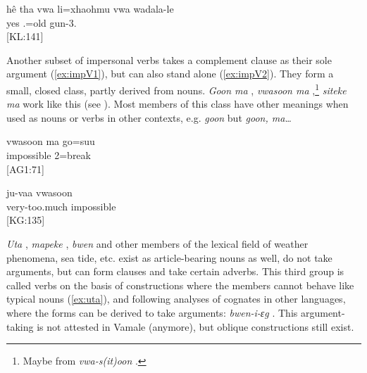 \ea \label{ex:vwa_have}\gll hê tha vwa li=xhaohmu vwa wadala-le\\
 yes   .=old  gun-3.\\
\glt {} {[KL:141]} 
\z

Another subset of impersonal verbs takes a complement clause as their sole argument (\ref{ex:impV1}), but can also stand alone (\ref{ex:impV2}). They form a small, closed class, partly derived from nouns. \textit{Goon ma} , \textit{vwasoon ma} ,\footnote{Maybe from \textit{vwa-s(it)oon} .} \textit{siteke ma}  work like this (see ). 
Most members of this class have other meanings when used as nouns or verbs in other contexts, e.g. \textit{goon}  but \textit{goon, ma\ldots} 


\ea\label{ex:impV1}\gll vwasoon ma go=suu\\
 impossible  2=break\\
\glt {} {[AG1:71]}
\z

\ea\label{ex:impV2}\gll ju-vaa vwasoon\\
 very-too.much impossible\\
\glt {} {[KG:135]}
\z


% 
%
%
%
%

%
%


\textit{Uta} , \textit{mapeke} , \textit{bwen}  and other members of the lexical field of weather phenomena, sea tide, etc. exist as article-bearing nouns as well, do not take arguments, but can form clauses and take certain adverbs. This third group is called verbs on the basis of constructions where the members cannot behave like typical nouns (\ref{ex:uta}), and following analyses of cognates in other languages, where the forms can be derived to take arguments: \textit{bwen-i-ɛg}  \parencite[302]{rivierre_langue_1980}. This argument-taking is not attested in Vamale (anymore), but oblique constructions still exist.



